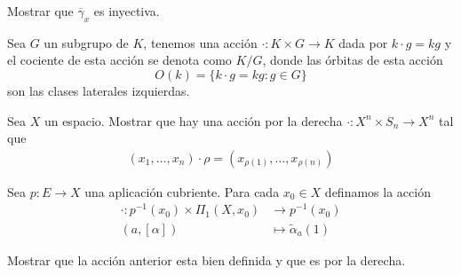 \begin{ejercicio}
    Mostrar que $\overline{\gamma}_x$ es inyectiva.
\end{ejercicio}
\begin{nota}
    Sea $G$ un subgrupo de $K$, tenemos una acción $\cdot:K\times G\to K$ dada por $k\cdot g=kg$ y el cociente de esta acción se denota como $K/G$, donde las órbitas de esta acción 
    $$O(k)=\{k\cdot g=kg:g\in G\}$$ 
    son las clases laterales izquierdas.
\end{nota}
\begin{ejercicio}
    Sea $X$ un espacio. Mostrar que hay una acción por la derecha $\cdot: X^n\times S_n\to X^n$ tal que
    \begin{align*}
        (x_1,\ldots,x_n)\cdot \rho=(x_{\rho(1)},\ldots,x_{\rho(n)})
    \end{align*}
\end{ejercicio}
\begin{definicion}
    Sea $p:E\to X$ una aplicación cubriente. Para cada $x_0\in X$ definamos la acción
    \begin{align*}
        \cdot:p^{-1}(x_0)\times \Pi_1(X,x_0)&\to p^{-1}(x_0)\\
        (a,[\alpha])&\mapsto \widetilde{\alpha}_a(1)
    \end{align*}
\end{definicion}
\begin{ejercicio}
    Mostrar que la acción anterior esta bien definida y que es por la derecha.
\end{ejercicio}


